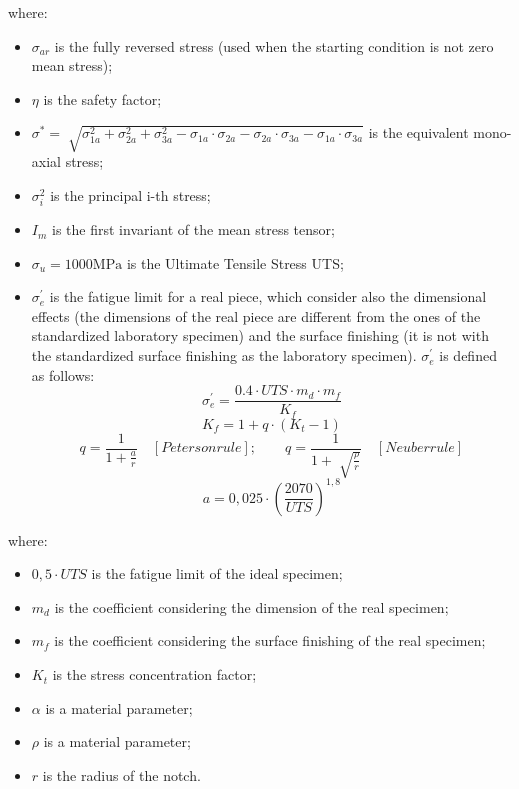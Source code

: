 \documentclass[a4paper,12pt]{article}
\begin{document}
where:

\begin{itemize}
\item $\sigma_{ar}$ is the fully reversed stress (used when the starting condition is not zero mean stress);
\item $\eta$ is the safety factor;
\item $\sigma^{*} = \sqrt[]{\sigma_{1a}^2+\sigma_{2a}^2+\sigma_{3a}^2-\sigma_{1a} \cdot \sigma_{2a}-\sigma_{2a} \cdot \sigma_{3a}-\sigma_{1a} \cdot \sigma_{3a}}$ is the equivalent mono-axial stress;
\item $\sigma_{i}^2$ is the principal i-th stress;
\item $I_m$ is the first invariant of the mean stress tensor;
\item $\sigma_u=1000 \text{MPa}$ is the Ultimate Tensile Stress UTS;
\item $\sigma_e^{'}$ is the fatigue limit for a real piece, which consider also the dimensional effects (the dimensions of the real piece are different from the ones of the standardized laboratory specimen) and the surface finishing (it is not with the standardized surface finishing as the laboratory specimen). $\sigma_e^{'}$ is defined as follows: 
\begin{equation}
\sigma_e^{'} = \frac{0.4 \cdot UTS \cdot m_d \cdot m_f}{K_f}
\end{equation}
\begin{equation}
K_f = 1+ q\cdot(K_t-1)
\end{equation}
\begin{equation}
q = \frac{1}{1+\frac{a}{r}} \quad [Peterson rule]; \quad
\quad q = \frac{1}{1+\sqrt[]{\frac{\rho}{r}}} \quad
[Neuber rule]
\end{equation}
\begin{equation}
a = 0,025\cdot\left(\frac{2070}{UTS}\right)^{1,8}
\end{equation}
\end{itemize}

where:
\begin{itemize}
\item $0,5 \cdot UTS$ is the fatigue limit of the ideal specimen;
\item $m_d$ is the coefficient considering the dimension of the real specimen;
\item $m_f$ is the coefficient considering the surface finishing of the real specimen;
\item $K_t$ is the stress concentration factor;
\item $\alpha$ is a material parameter;
\item $\rho$ is a material parameter;
\item $r$ is the radius of the notch.
\end{itemize}
\end{document}

